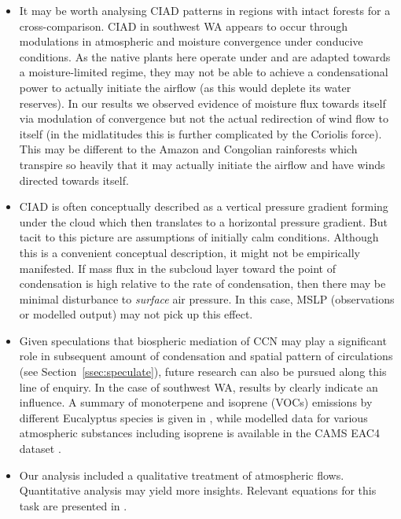 \begin{itemize}
	\item It may be worth analysing \ac{CIAD} patterns in regions with intact forests for a cross-comparison. \ac{CIAD} in southwest \ac{WA} appears to occur through modulations in atmospheric and moisture convergence under conducive conditions. As the native plants here operate under and are adapted towards a moisture-limited regime, they may not be able to achieve a condensational power to actually initiate the airflow (as this would deplete its water reserves). In our results we observed evidence of moisture flux towards itself via modulation of convergence but not the actual redirection of wind flow to itself (in the midlatitudes this is further complicated by the Coriolis force). This may be different to the Amazon and Congolian rainforests which transpire so heavily that it may actually initiate the airflow and have winds directed towards itself.
	\item \ac{CIAD} is often conceptually described as a vertical pressure gradient forming under the cloud which then translates to a horizontal pressure gradient. But tacit to this picture are assumptions of initially calm conditions. Although this is a convenient conceptual description, it might not be empirically manifested. If mass flux in the subcloud layer toward the point of condensation is high relative to the rate of condensation, then there may be minimal disturbance to \textit{surface} air pressure. In this case, \ac{MSLP} (observations or modelled output) may not pick up this effect.
	\item Given speculations that biospheric mediation of \ac{CCN} may play a significant role in subsequent amount of condensation and spatial pattern of circulations (see Section~\ref{ssec:speculate}), future research can also be pursued along this line of enquiry. In the case of southwest \ac{WA}, results by \citet{junkermann2009} clearly indicate an influence. A summary of monoterpene and isoprene (\acp{VOC}) emissions by different Eucalyptus species is given in \citep{he2000_monoterpene}, while modelled data for various atmospheric substances including isoprene is available in the \ac{CAMS} \ac{EAC4} dataset \citep{eac4}.
	\item Our analysis included a qualitative treatment of atmospheric flows. Quantitative analysis may yield more insights. Relevant equations for this task are presented in \citet{makarieva2014, makarieva2017}.
\end{itemize}

